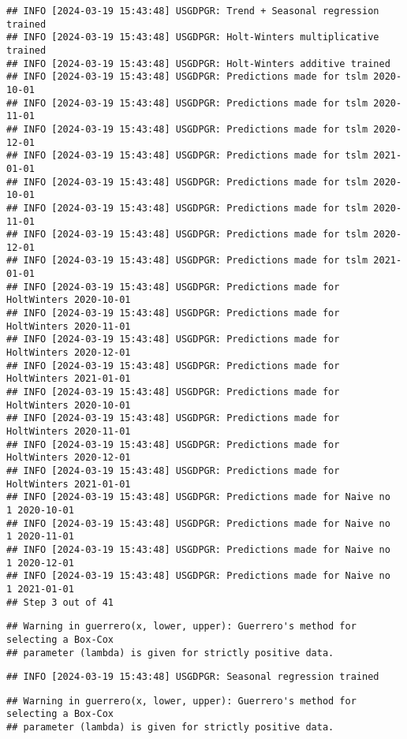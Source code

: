 \documentclass[
]{article}
\begin{document}
\begin{verbatim}
## INFO [2024-03-19 15:43:48] USGDPGR: Trend + Seasonal regression trained
## INFO [2024-03-19 15:43:48] USGDPGR: Holt-Winters multiplicative trained
## INFO [2024-03-19 15:43:48] USGDPGR: Holt-Winters additive trained
## INFO [2024-03-19 15:43:48] USGDPGR: Predictions made for tslm 2020-10-01
## INFO [2024-03-19 15:43:48] USGDPGR: Predictions made for tslm 2020-11-01
## INFO [2024-03-19 15:43:48] USGDPGR: Predictions made for tslm 2020-12-01
## INFO [2024-03-19 15:43:48] USGDPGR: Predictions made for tslm 2021-01-01
## INFO [2024-03-19 15:43:48] USGDPGR: Predictions made for tslm 2020-10-01
## INFO [2024-03-19 15:43:48] USGDPGR: Predictions made for tslm 2020-11-01
## INFO [2024-03-19 15:43:48] USGDPGR: Predictions made for tslm 2020-12-01
## INFO [2024-03-19 15:43:48] USGDPGR: Predictions made for tslm 2021-01-01
## INFO [2024-03-19 15:43:48] USGDPGR: Predictions made for HoltWinters 2020-10-01
## INFO [2024-03-19 15:43:48] USGDPGR: Predictions made for HoltWinters 2020-11-01
## INFO [2024-03-19 15:43:48] USGDPGR: Predictions made for HoltWinters 2020-12-01
## INFO [2024-03-19 15:43:48] USGDPGR: Predictions made for HoltWinters 2021-01-01
## INFO [2024-03-19 15:43:48] USGDPGR: Predictions made for HoltWinters 2020-10-01
## INFO [2024-03-19 15:43:48] USGDPGR: Predictions made for HoltWinters 2020-11-01
## INFO [2024-03-19 15:43:48] USGDPGR: Predictions made for HoltWinters 2020-12-01
## INFO [2024-03-19 15:43:48] USGDPGR: Predictions made for HoltWinters 2021-01-01
## INFO [2024-03-19 15:43:48] USGDPGR: Predictions made for Naive no  1 2020-10-01
## INFO [2024-03-19 15:43:48] USGDPGR: Predictions made for Naive no  1 2020-11-01
## INFO [2024-03-19 15:43:48] USGDPGR: Predictions made for Naive no  1 2020-12-01
## INFO [2024-03-19 15:43:48] USGDPGR: Predictions made for Naive no  1 2021-01-01
## Step 3 out of 41
\end{verbatim}

\begin{verbatim}
## Warning in guerrero(x, lower, upper): Guerrero's method for selecting a Box-Cox
## parameter (lambda) is given for strictly positive data.
\end{verbatim}

\begin{verbatim}
## INFO [2024-03-19 15:43:48] USGDPGR: Seasonal regression trained
\end{verbatim}

\begin{verbatim}
## Warning in guerrero(x, lower, upper): Guerrero's method for selecting a Box-Cox
## parameter (lambda) is given for strictly positive data.
\end{verbatim}
\end{document}
